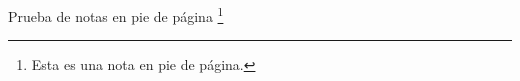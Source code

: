\documentclass{article}
\begin{document}
Prueba de notas en pie de página \footnote{Esta es una nota en pie de página.}
\end{document}
